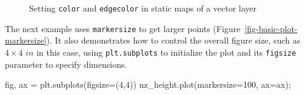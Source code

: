 \documentclass[
  letterpaper,
]{krantz}
\newenvironment{Shaded}{\begin{snugshade}}{\end{snugshade}}
\newcommand{\DecValTok}[1]{\textcolor[rgb]{0.68,0.00,0.00}{#1}}
\newcommand{\NormalTok}[1]{\textcolor[rgb]{0.00,0.23,0.31}{#1}}
\newcommand{\OperatorTok}[1]{\textcolor[rgb]{0.37,0.37,0.37}{#1}}
\begin{document}
\begin{figure}

\begin{minipage}{0.33\linewidth}



\end{minipage}%
%
\begin{minipage}{0.33\linewidth}



\end{minipage}%
%
\begin{minipage}{0.33\linewidth}



\end{minipage}%

\caption{\label{fig-basic-plot}Setting \texttt{color} and
\texttt{edgecolor} in static maps of a vector layer}

\end{figure}%

The next example uses \texttt{markersize} to get larger points
(Figure~\ref{fig-basic-plot-markersize}). It also demonstrates how to
control the overall figure size, such as \(4 \times 4\) \(in\) in this
case, using \texttt{plt.subplots} to initialize the plot and its
\texttt{figsize} parameter to specify dimensions.

\begin{Shaded}
\begin{Highlighting}[]
\NormalTok{fig, ax }\OperatorTok{=}\NormalTok{ plt.subplots(figsize}\OperatorTok{=}\NormalTok{(}\DecValTok{4}\NormalTok{,}\DecValTok{4}\NormalTok{))}
\NormalTok{nz\_height.plot(markersize}\OperatorTok{=}\DecValTok{100}\NormalTok{, ax}\OperatorTok{=}\NormalTok{ax)}\OperatorTok{;}
\end{Highlighting}
\end{Shaded}
\end{document}
